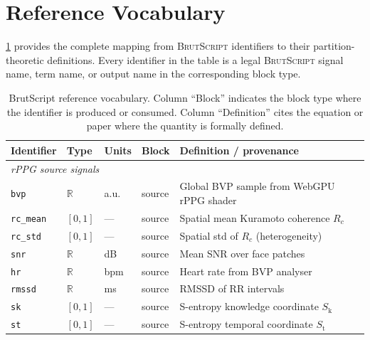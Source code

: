 \documentclass[10pt,twocolumn,a4paper]{article}
\theoremstyle{definition}
\theoremstyle{remark}
\newcommand{\BS}{\textsc{BrutScript}}
\newcommand{\SK}{S_{\mathrm{k}}}
\newcommand{\ST}{S_{\mathrm{t}}}
\newcommand{\Rc}{R_c}
\begin{document}
\section{Reference Vocabulary}
\label{sec:vocabulary}

\cref{tab:vocabulary} provides the complete mapping from \BS{}
identifiers to their partition-theoretic definitions.  Every identifier
in the table is a legal \BS{} signal name, term name, or output name
in the corresponding block type.

\begin{table}[ht]
\centering
\caption{BrutScript reference vocabulary. Column ``Block'' indicates
the block type where the identifier is produced or consumed.
Column ``Definition'' cites the equation or paper where the quantity
is formally defined.}
\label{tab:vocabulary}
\footnotesize
\begin{tabularx}{\textwidth}{llllX}
\toprule
\textbf{Identifier} & \textbf{Type} & \textbf{Units} & \textbf{Block} & \textbf{Definition / provenance} \\
\midrule
\multicolumn{5}{l}{\textit{rPPG source signals}} \\
\texttt{bvp}            & $\mathbb{R}$ & a.u.      & source & Global BVP sample from WebGPU rPPG shader~\cite{sachikonye2024optical} \\
\texttt{rc\_mean}       & $[0,1]$      & —         & source & Spatial mean Kuramoto coherence $\Rc$~\cite{kuramoto1984,sachikonye2024disambiguation} \\
\texttt{rc\_std}        & $[0,1]$      & —         & source & Spatial std of $\Rc$ (heterogeneity)~\cite{sachikonye2024optical} \\
\texttt{snr}            & $\mathbb{R}$ & dB        & source & Mean SNR over face patches~\cite{sachikonye2024optical} \\
\texttt{hr}             & $\mathbb{R}$ & bpm       & source & Heart rate from BVP analyser~\cite{sachikonye2024optical} \\
\texttt{rmssd}          & $\mathbb{R}$ & ms        & source & RMSSD of RR intervals~\cite{malik1996,sachikonye2024disambiguation} \\
\texttt{sk}             & $[0,1]$      & —         & source & S-entropy knowledge coordinate $\SK$~\cite{sachikonye2024disambiguation} \\
\texttt{st}             & $[0,1]$      & —         & source & S-entropy temporal coordinate $\ST$~\cite{sachikonye2024disambiguation} \\

\end{tabularx}
\end{table}
\end{document}
